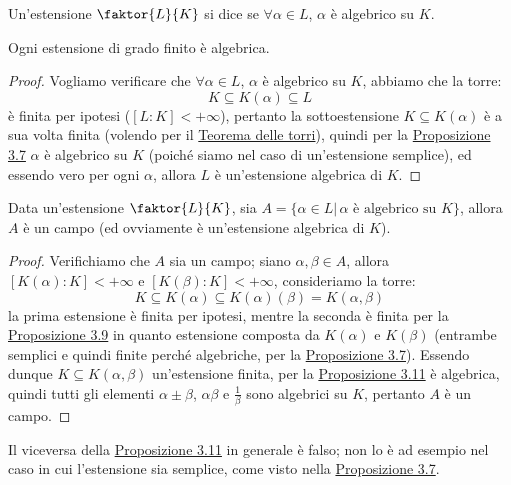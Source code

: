 \documentclass[11pt]{scrartcl}
\begin{document}
\begin{definition}
    Un'estensione $\faktor{L}{K}$ si dice  se $\forall \alpha \in L$, $\alpha$ è algebrico su $K$.
\end{definition}

\begin{proposition}
    \label{3.11}
    Ogni estensione di grado finito è algebrica.
\end{proposition}

\begin{proof}
    Vogliamo verificare che $\forall \alpha \in L$, $\alpha$ è algebrico su $K$, abbiamo che la torre:
    \[ K \subseteq K(\alpha) \subseteq L
        \]
    è finita per ipotesi ($[L : K] < +\infty$), pertanto la sottoestensione $K \subseteq K(\alpha)$ è a sua volta finita (volendo per il \hyperref[torri]{Teorema delle torri}),
    quindi per la \hyperref[3.7]{Proposizione 3.7} $\alpha$ è algebrico su $K$ (poiché siamo nel caso di un'estensione semplice), ed essendo vero per ogni $\alpha$, allora $L$ è un'estensione algebrica di $K$.
\end{proof}

\begin{proposition}
    \label{3.12}
    Data un'estensione $\faktor{L}{K}$, sia $A = \{\alpha \in L | \, \text{$\alpha$ è algebrico su $K$}\}$, allora $A$ è un campo (ed ovviamente
    è un'estensione algebrica di $K$).
\end{proposition}

\begin{proof}
    Verifichiamo che $A$ sia un campo; siano $\alpha,\beta \in A$, allora $[K(\alpha):K] <+\infty$ e $[K(\beta):K]<+\infty$, consideriamo la torre:
    \[ K \subseteq K(\alpha) \subseteq K(\alpha)(\beta) = K(\alpha,\beta)
        \]
    la prima estensione è finita per ipotesi, mentre la seconda è finita per la \hyperref[3.9]{Proposizione 3.9} in quanto estensione composta da $K(\alpha)$ e $K(\beta)$ (entrambe semplici e quindi finite perché algebriche, per la \hyperref[3.7]{Proposizione 3.7}).
    Essendo dunque $K \subseteq K(\alpha,\beta)$ un'estensione finita, per la \hyperref[3.11]{Proposizione 3.11}
    è algebrica, quindi tutti gli elementi $\alpha\pm\beta$, $\alpha\beta$ e $\displaystyle\frac{1}{\beta}$ sono algebrici su $K$, pertanto $A$ è un campo.
\end{proof}

\begin{remark}
    Il viceversa della \hyperref[3.11]{Proposizione 3.11} in generale è falso; non lo è ad esempio nel caso in cui l'estensione sia semplice, come visto nella \hyperref[3.7]{Proposizione 3.7}.
\end{remark}
\end{document}
